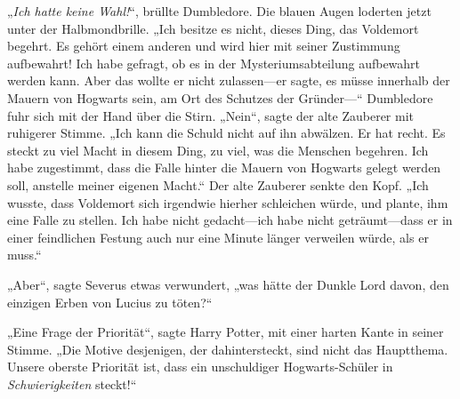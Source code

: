 „\emph{Ich hatte keine Wahl!}“, brüllte Dumbledore. Die blauen Augen loderten jetzt unter der Halbmondbrille.
„Ich besitze es nicht, dieses Ding, das Voldemort begehrt. Es gehört einem anderen und wird hier mit seiner Zustimmung aufbewahrt! Ich habe gefragt, ob es in der Mysteriumsabteilung aufbewahrt werden kann. Aber das wollte er nicht zulassen—er sagte, es müsse innerhalb der Mauern von Hogwarts sein, am Ort des Schutzes der Gründer—“ Dumbledore fuhr sich mit der Hand über die Stirn.
„Nein“, sagte der alte Zauberer mit ruhigerer Stimme.
„Ich kann die Schuld nicht auf ihn abwälzen. Er hat recht. Es steckt zu viel Macht in diesem Ding, zu viel, was die Menschen begehren. Ich habe zugestimmt, dass die Falle hinter die Mauern von Hogwarts gelegt werden soll, anstelle meiner eigenen Macht.“ Der alte Zauberer senkte den Kopf.
„Ich wusste, dass Voldemort sich irgendwie hierher schleichen würde, und plante, ihm eine Falle zu stellen. Ich habe nicht gedacht—ich habe nicht geträumt—dass er in einer feindlichen Festung auch nur eine Minute länger verweilen würde, als er muss.“

„Aber“, sagte Severus etwas verwundert, „was hätte der Dunkle Lord davon, den einzigen Erben von Lucius zu töten?“

„Eine Frage der Priorität“, sagte Harry Potter, mit einer harten Kante in seiner Stimme.
„Die Motive desjenigen, der dahintersteckt, sind nicht das Hauptthema. Unsere oberste Priorität ist, dass ein unschuldiger Hogwarts-Schüler in \emph{Schwierigkeiten} steckt!“

